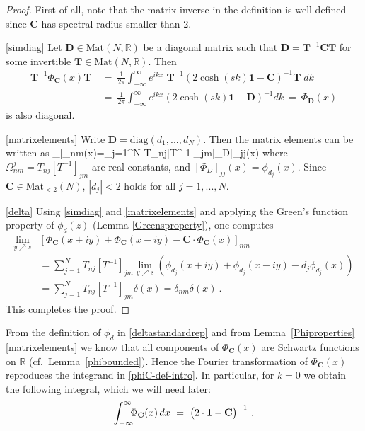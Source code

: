 \documentclass[12pt]{article}
\theoremstyle{plain}
\theoremstyle{definition}
\numberwithin{equation}{section}
\numberwithin{theorem}{section}
\def\be#1\ee{\begin{equation}#1\end{equation}}
\renewcommand{\vec}[1]{\mathbf{#1}}
\begin{document}
\begin{proof}
First of all, note that the matrix inverse in the definition is well-defined since $\vec{C}$ has spectral radius smaller than 2.

\medskip

\noindent
\ref{simdiag} Let $\vec{D}\in\mathrm{Mat}(N,\mathbb{R})$ be a
diagonal matrix such that $\vec{D} = \vec{T}^{-1}\vec{C}\vec{T}$ for some invertible $\vec{T}\in \mathrm{Mat}(N,\mathbb {R})$. Then
\begin{align}\vec{T}^{-1}\Phi_{\vec C}(x)\vec{T} &~=~ \frac{1}{2\pi}\int_{-\infty}^{\infty} e^{ikx}\;\vec{T}^{-1}(2\cosh(sk)\mathbf{1}-\vec{C})^{-1}\vec{T} \;dk \nonumber\\
&~=~\frac{1}{2\pi}\int_{-\infty}^{\infty} e^{ikx}\left(2\cosh(sk)\mathbf{1}-\vec{D}\right)^{-1}dk 
~=~ \Phi_{\vec D}(x)
\end{align}
is also diagonal.

\medskip

\noindent
\ref{matrixelements} Write $\vec{D}=\mathrm{diag}(d_1,...,d_N)$. Then the matrix elements can be written as \be[\Phi_{\vec C}]_{nm}(x)=\sum_{j=1}^N T_{nj}[T^{-1}]_{jm}[\Phi_D]_{jj}(x) \ee where $\Omega_{nm}^j=T_{nj}[T^{-1}]_{jm}$ are real constants, and $[\Phi_D]_{jj}(x) = \phi_{d_j}(x)$. 
	Since $\vec{C} \in \mathrm{Mat}_{<2}(N)$,
$|d_j|<2$ holds for all $j=1,...,N$.

\medskip

\noindent
\ref{delta} Using \ref{simdiag} and \ref{matrixelements} and applying the Green's function property of $\phi_d(z)$ (Lemma \ref{Greensproperty}), one computes
\begin{align}
\lim_{y\nearrow  s}&\left[\Phi_{\vec C}(x+iy) + \Phi_{\vec C}(x-iy) - \vec{C}\cdot \Phi_{\vec C}(x)\right]_{nm} \nonumber\\ &= \sum_{j=1}^N T_{nj}[T^{-1}]_{jm}\lim_{y\nearrow  s}\left(\phi_{d_j}(x+iy) +\phi_{d_j}(x-iy) -d_j\phi_{d_j}(x)\right) \nonumber\\
&=\sum_{j=1}^N T_{nj}[T^{-1}]_{jm}\delta(x) 
=\delta_{nm}\delta(x) \ .
\end{align}
This completes the proof.
\end{proof}

From the definition of $\phi_d$ in \eqref{deltastandardrep} and from
Lemma~\ref{Phiproperties}\,\ref{matrixelements} we know that all components of $\Phi_{\vec C}(x)$ are Schwartz functions on $\mathbb{R}$ (cf.\ Lemma~\ref{phibounded}). Hence the Fourier transformation of $\Phi_{\vec C}(x)$  reproduces the integrand in \eqref{phiC-def-intro}. In particular, for $k=0$ we obtain the following integral, which we will need later:
\begin{equation}\label{phiC-infinf-integral}
\int_{-\infty}^\infty
\hspace{-.5em}
\Phi_{\vec C}(x) \,dx ~=~
\big( 2 \cdot \mathbf{1}-\vec{C} \big)^{-1} \ .
\end{equation}
\end{document}
